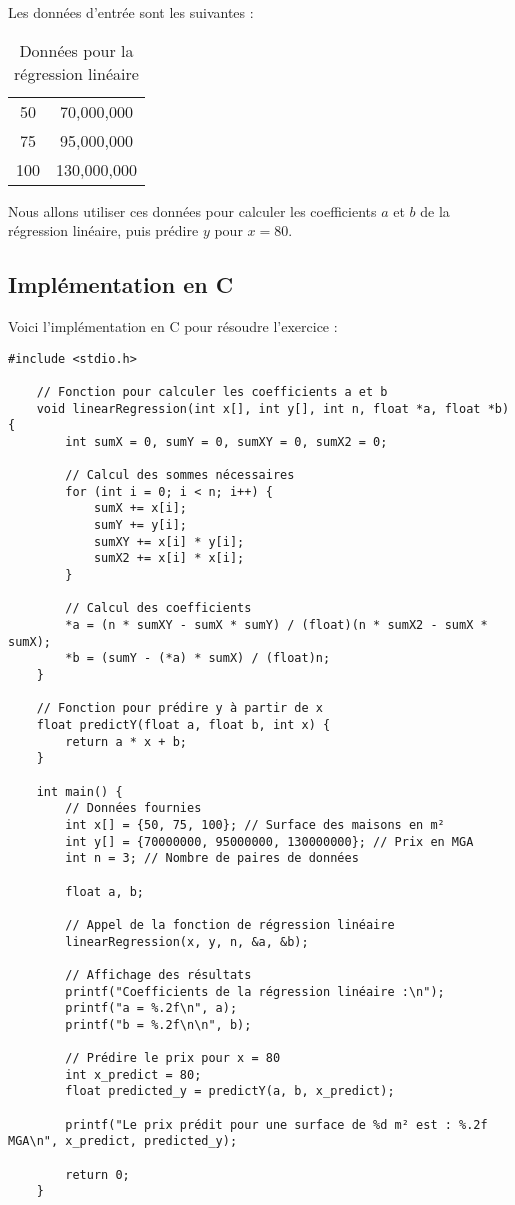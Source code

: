Les données d'entrée sont les suivantes :

\begin{table}[h]
	\centering
	\caption{Données pour la régression linéaire}
	\begin{tabular}{|c|c|}
		\hline
		\text{Surface (m²)} & \text{Prix (MGA)} \\ \hline
		50 & 70,000,000 \\ \hline
		75 & 95,000,000 \\ \hline
		100 & 130,000,000 \\ \hline
	\end{tabular}
\end{table}

Nous allons utiliser ces données pour calculer les coefficients \(a\) et \(b\) de la régression linéaire, puis prédire \(y\) pour \(x = 80\).

\subsection*{Implémentation en C}

Voici l'implémentation en C pour résoudre l'exercice :

\begin{lstlisting}[caption=Implémentation de la Régression Linéaire en C]
	#include <stdio.h>
	
	// Fonction pour calculer les coefficients a et b
	void linearRegression(int x[], int y[], int n, float *a, float *b) {
		int sumX = 0, sumY = 0, sumXY = 0, sumX2 = 0;
		
		// Calcul des sommes nécessaires
		for (int i = 0; i < n; i++) {
			sumX += x[i];
			sumY += y[i];
			sumXY += x[i] * y[i];
			sumX2 += x[i] * x[i];
		}
		
		// Calcul des coefficients
		*a = (n * sumXY - sumX * sumY) / (float)(n * sumX2 - sumX * sumX);
		*b = (sumY - (*a) * sumX) / (float)n;
	}
	
	// Fonction pour prédire y à partir de x
	float predictY(float a, float b, int x) {
		return a * x + b;
	}
	
	int main() {
		// Données fournies
		int x[] = {50, 75, 100}; // Surface des maisons en m²
		int y[] = {70000000, 95000000, 130000000}; // Prix en MGA
		int n = 3; // Nombre de paires de données
		
		float a, b;
		
		// Appel de la fonction de régression linéaire
		linearRegression(x, y, n, &a, &b);
		
		// Affichage des résultats
		printf("Coefficients de la régression linéaire :\n");
		printf("a = %.2f\n", a);
		printf("b = %.2f\n\n", b);
		
		// Prédire le prix pour x = 80
		int x_predict = 80;
		float predicted_y = predictY(a, b, x_predict);
		
		printf("Le prix prédit pour une surface de %d m² est : %.2f MGA\n", x_predict, predicted_y);
		
		return 0;
	}
\end{lstlisting}


